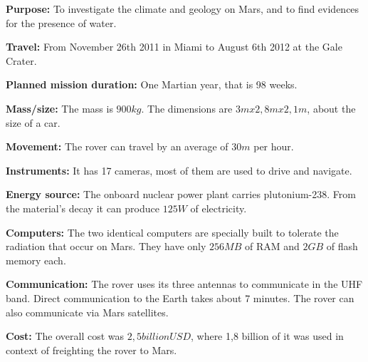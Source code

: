 \begin{tcolorbox}[colback=red!5,colframe=DarkRed!40!black,title=Curiosity: 10 facts about the rover]

\textbf{Purpose:} To investigate the climate and geology on Mars, and to find evidences for the presence of water.

\textbf{Travel:} From November 26th 2011 in Miami to August 6th 2012 at the Gale Crater.

\textbf{Planned mission duration:} One Martian year, that is 98 weeks.

\textbf{Mass/size:} The mass is $900 kg$. The dimensions are $3 m x 2,8 m x 2,1 m$, about the size of a car.

\textbf{Movement:} The rover can travel by an average of $30 m$ per hour.

\textbf{Instruments:} It has 17 cameras, most of them are used to drive and navigate.

\textbf{Energy source:} The onboard nuclear power plant carries plutonium-238. From the material's decay it can produce $125 W$ of electricity.

\textbf{Computers:} The two identical computers are specially built to tolerate the radiation that occur on Mars. They have only $256 MB$ of RAM and $2 GB$ of flash memory each.

\textbf{Communication:} The rover uses its three antennas to communicate in the UHF band. Direct communication to the Earth takes about 7 minutes. The rover can also communicate via Mars satellites.

\textbf{Cost:} The overall cost was $2,5 billion USD$, where 1,8 billion of it was used in context of freighting the rover to Mars.

\end{tcolorbox}